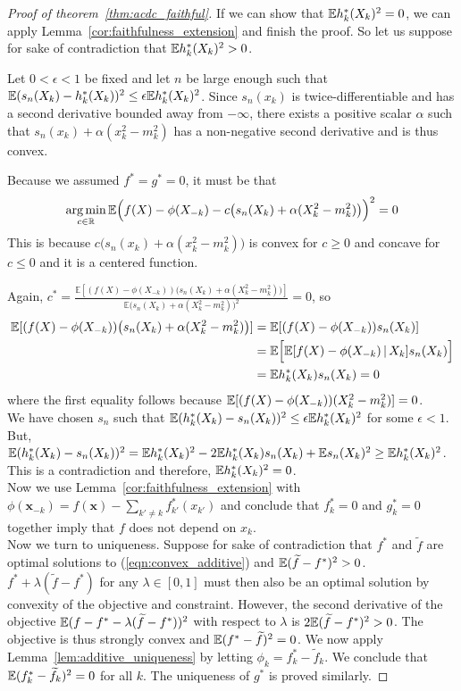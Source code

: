 \begin{proof}[Proof of theorem~\ref{thm:acdc_faithful}]
If we can show that ${\mathbb E} h^*_k(X_k)^2 = 0$, we can apply
Lemma~\ref{cor:faithfulness_extension} and finish the proof. So let us
suppose for sake of contradiction that ${\mathbb E} h^*_k(X_k)^2 > 0$.

Let $0 < \epsilon < 1$ be fixed and let $n$ be large enough such that ${\mathbb E}( s_n(X_k) - h^*_k(X_k))^2 \leq \epsilon {\mathbb E} h^*_k(X_k)^2 $.
Since $s_n(x_k)$ is twice-differentiable and has a second derivative
bounded away from $-\infty$, there exists a positive scalar $\alpha$
such that $s_n(x_k) + \alpha(x_k^2 - m_k^2)$ has a non-negative second
derivative and is thus convex.

Because we assumed $f^* = g^* = 0$, it must be that
\[
\mathop{\text{\rm arg\,min}}_{c \in {\mathbb R}} 
{\mathbb E}\Big( f(X) - \phi(X_{-k}) - c\big( s_n(X_k) + \alpha(X_k^2 - m_k^2)\big) \Big)^2 = 0
\]
This is because $c\big( s_n(x_k) + \alpha(x_k^2 - m_k^2) \big)$ is
convex for $c \geq 0$ and concave for $c \leq 0$ and it is a centered
function.

Again, $c^* = \frac{\mathbb{E}[(f(X)-\phi(X_{-k}))\big( 
           s_n(X_k) + \alpha (X_k^2 - m_k^2) \big)]}{\mathbb{E}
       \big( s_n(X_k) + \alpha (X_k^2 - m_k^2) \big)^2} = 0$, so
\begin{align*}
\mathbb{E}[ (f(X)-\phi(X_{-k})) \big( s_n(X_k) + \alpha (X_k^2-m_k^2) \big) ] &= 
\mathbb{E}[ (f(X) - \phi(X_{-k})) s_n(X_k) ] \\
& = \mathbb{E}\Big[ \mathbb{E}[ f(X) - \phi(X_{-k}) {\,|\,} X_k]  s_n(X_k) \Big] \\
& = \mathbb{E} h^*_k(X_k) s_n(X_k)  = 0
\end{align*}
where the first equality follows because ${\mathbb E}[ (f(X) - \phi(X_{-k})) (X_k^2 - m_k^2)] = 0$. \\

We have chosen $s_n$ such that ${\mathbb E}(h^*_k(X_k) - s_n(X_k))^2 \leq \epsilon {\mathbb E} h^*_k(X_k)^2$ for some $\epsilon < 1$. But, ${\mathbb E} (h^*_k(X_k) - s_n(X_k))^2 = {\mathbb E} h^*_k(X_k)^2 - 2 {\mathbb E} h^*_k(X_k)s_n(X_k) + {\mathbb E} s_n(X_k)^2 \geq {\mathbb E} h^*_k(X_k)^2$. This is a contradiction and therefore, ${\mathbb E} h^*_k(X_k)^2 = 0$.\\

Now we use
Lemma~\ref{cor:faithfulness_extension} with $\phi(\mathbf{x}_{-k}) =
f(\mathbf{x}) - \sum_{k' \neq k} f^*_{k'} (x_{k'})$ and conclude that
$f^*_k = 0$ and $g^*_k = 0$ together imply that $f$ does not depend on $x_k$.\\

Now we turn to uniqueness. Suppose for sake of contradiction that
$f^*$ and $\tilde{f}$ are optimal solutions to
(\ref{eqn:convex_additive}) and ${\mathbb E} (\widetilde{f} - f^*)^2 > 0$.  $f^* +
\lambda ( \tilde{f} - f^*)$ for any $\lambda \in [0,1]$ must then also
be an optimal solution by convexity of the objective and
constraint. However, the second derivative of the objective ${\mathbb E}( f -
f^* - \lambda(\widetilde{f} - f^*))^2$ with respect to $\lambda$ is $2 {\mathbb E}(
\widetilde{f} - f^*)^2 > 0$. The objective is thus strongly convex and
${\mathbb E}(f^* - \widetilde{f})^2 = 0$. We now apply
Lemma~\ref{lem:additive_uniqueness} by letting $\phi_k = f^*_k -
\tilde{f}_k$. We conclude that ${\mathbb E} (f^*_k - \widetilde{f}_k)^2 = 0$ for
all $k$. The uniqueness of $g^*$ is proved similarly.
\end{proof}


